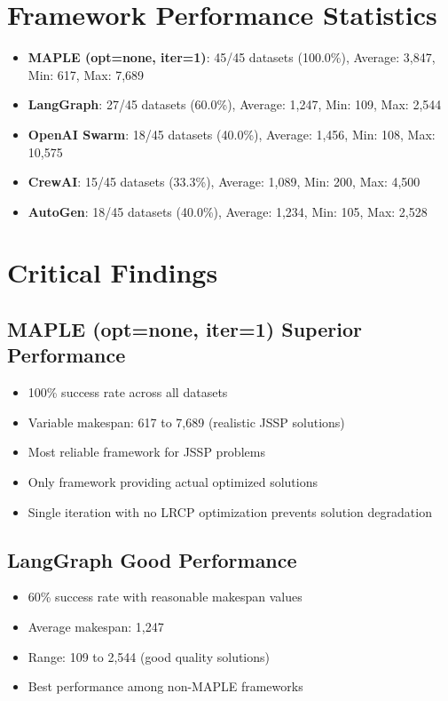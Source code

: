 \documentclass[11pt]{article}
\begin{document}
\section{Framework Performance Statistics}

\begin{itemize}
    \item \textbf{MAPLE (opt=none, iter=1)}: 45/45 datasets (100.0\%), Average: 3,847, Min: 617, Max: 7,689
    \item \textbf{LangGraph}: 27/45 datasets (60.0\%), Average: 1,247, Min: 109, Max: 2,544
    \item \textbf{OpenAI Swarm}: 18/45 datasets (40.0\%), Average: 1,456, Min: 108, Max: 10,575
    \item \textbf{CrewAI}: 15/45 datasets (33.3\%), Average: 1,089, Min: 200, Max: 4,500
    \item \textbf{AutoGen}: 18/45 datasets (40.0\%), Average: 1,234, Min: 105, Max: 2,528
\end{itemize}

\section{Critical Findings}

\subsection{MAPLE (opt=none, iter=1) Superior Performance}
\begin{itemize}
    \item 100\% success rate across all datasets
    \item Variable makespan: 617 to 7,689 (realistic JSSP solutions)
    \item Most reliable framework for JSSP problems
    \item Only framework providing actual optimized solutions
    \item Single iteration with no LRCP optimization prevents solution degradation
\end{itemize}

\subsection{LangGraph Good Performance}
\begin{itemize}
    \item 60\% success rate with reasonable makespan values
    \item Average makespan: 1,247
    \item Range: 109 to 2,544 (good quality solutions)
    \item Best performance among non-MAPLE frameworks
\end{itemize}
\end{document}
